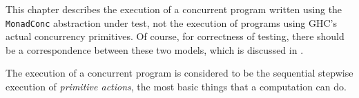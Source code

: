 This chapter describes the execution of a concurrent program written
using the \verb|MonadConc| abstraction under test, not the execution
of programs using GHC's actual concurrency primitives. Of course, for
correctness of testing, there should be a correspondence between these
two models, which is discussed in .

The execution of a concurrent program is considered to be the
sequential stepwise execution of \emph{primitive actions}, the most
basic things that a computation can do.
